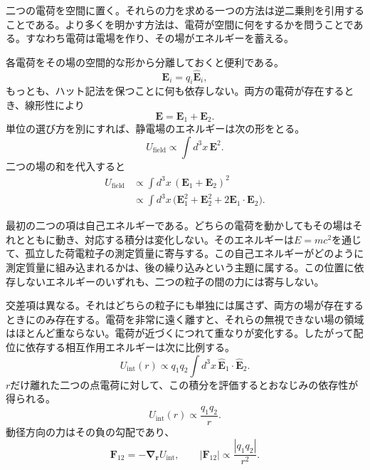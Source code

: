 二つの電荷を空間に置く。それらの力を求める一つの方法は逆二乗則を引用することである。より多くを明かす方法は、電荷が空間に何をするかを問うことである。すなわち電荷は電場を作り、その場がエネルギーを蓄える。

各電荷をその場の空間的な形から分離しておくと便利である。
\begin{equation}
\mathbf E_i=q_i\widehat{\mathbf E}_i,
\end{equation}
もっとも、ハット記法を保つことに何も依存しない。両方の電荷が存在するとき、線形性により
\begin{equation}
\mathbf{E}=\mathbf{E}_1+\mathbf{E}_2.
\end{equation}
単位の選び方を別にすれば、静電場のエネルギーは次の形をとる。
\begin{equation}
U_{\text{field}}\propto\int d^3x\,\mathbf{E}^2.
\end{equation}
二つの場の和を代入すると
\begin{align}
U_{\text{field}}
&\propto\int d^3x\,(\mathbf{E}_1+\mathbf{E}_2)^2 \\
&\propto\int d^3x\,\bigl(\mathbf{E}_1^2+\mathbf{E}_2^2
  +2\mathbf{E}_1\!\cdot\!\mathbf{E}_2\bigr).
\end{align}

最初の二つの項は自己エネルギーである。どちらの電荷を動かしてもその場はそれとともに動き、対応する積分は変化しない。そのエネルギーは\(E=mc^2\)を通じて、孤立した荷電粒子の測定質量に寄与する。この自己エネルギーがどのように測定質量に組み込まれるかは、後の繰り込みという主題に属する。この位置に依存しないエネルギーのいずれも、二つの粒子の間の力には寄与しない。

交差項は異なる。それはどちらの粒子にも単独には属さず、両方の場が存在するときにのみ存在する。電荷を非常に遠く離すと、それらの無視できない場の領域はほとんど重ならない。電荷が近づくにつれて重なりが変化する。したがって配位に依存する相互作用エネルギーは次に比例する。
\begin{equation}
U_{\text{int}}(r)\propto q_1q_2\int d^3x\,
\widehat{\mathbf E}_1\!\cdot\!\widehat{\mathbf E}_2.
\end{equation}
\(r\)だけ離れた二つの点電荷に対して、この積分を評価するとおなじみの依存性が得られる。
\begin{equation}
U_{\text{int}}(r)\propto\frac{q_1q_2}{r}.
\end{equation}
動径方向の力はその負の勾配であり、
\begin{equation}
\mathbf F_{12}=-\boldsymbol\nabla_{\mathbf r}U_{\text{int}},
\qquad
|\mathbf F_{12}|\propto\frac{|q_1q_2|}{r^2}.
\end{equation}

